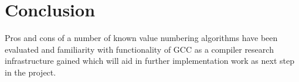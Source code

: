 \chapter{Conclusion}

Pros and cons of a number of known value numbering algorithms have been evaluated and familiarity with functionality of GCC as a compiler research infrastructure gained which will aid in further implementation work as next step in the project.
